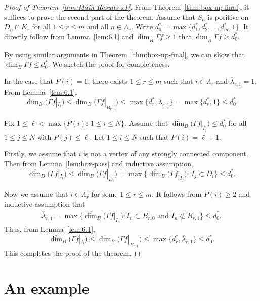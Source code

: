 \documentclass[11pt]{amsart}
\theoremstyle{definition}
\theoremstyle{remark}
\numberwithin{equation}{section}
\newcommand{\uplam}{{\overline{\lambda}}}
\def\updimB{\overline{\dim}_B}
\def\lowdimB{\underline{\dim}_B}
\begin{document}
\begin{proof}[Proof of Theorem~\ref{thm:Main-Results-x1}]
From Theorem~\ref{thm:box-up-final}, it suffices to prove the second part of the theorem. Assume that $S_n $ is positive on $D_n \cap K_r$ for all $1\leq r\leq m$ and all $n\in \Lambda_r$. Write $d_0^*=\max \{ d_1^*, d_2^*, \ldots, d_m^*,1\}.$
It directly follow from Lemma~\ref{lem:6.1} and $\lowdimB \Gamma f \geq 1$ that 
$\lowdimB \Gamma f \geq d_0^*$.

By using similar arguments in Theorem~\ref{thm:box-up-final}, we can show that $\updimB \Gamma f \leq d_0^*$. We sketch the proof for completeness.


In the case that $P(i)=1$, there exists $1\leq r\leq m$ such that $i\in \Lambda_r$ and $\uplam_{r,1}=1$. From Lemma~\ref{lem:6.1},
$$\updimB \big(\Gamma f|_{I_i}\big)\leq \updimB \big(\Gamma f|_{B_{r,1}}\big) \leq \max \{ d_r^*, \uplam_{r,1}\}=\max \{ d_r^*, 1\}\leq d_0^*. $$



Fix $1\leq \ell<\max\{P(i):\, 1\leq i\leq N\}$. Assume that $\updimB \big(\Gamma f|_{I_j}\big) \leq d_0^*$ for all $1\leq j \leq N$ with $P(j)\leq \ell$. Let $1\leq i\leq N$ such that $P(i)= \ell+1$. 

Firstly, we assume that $i$ is not a vertex of any strongly connected component. 
Then from Lemma~\ref{lem:box-pass} and inductive assumption,
\[ \updimB \big(\Gamma f|_{I_i}\big)  \leq  \updimB \big(\Gamma f|_{D_i}\big) =\max\big\{\updimB \big(\Gamma f|_{I_j}\big):\,I_{j}\subset D_{i}\big\}\leq d_0^*. \]

Now we assume that $ i \in \Lambda_r$ for some $1\leq r\leq m $. 
It follows from $P(i)\geq 2$ and inductive assumption that
\begin{align*}
	\uplam_{r,1} =\max\Big\{ \updimB \big(\Gamma f|_{I_n}\big): I_n\subset B_{r,0} \textrm{ and } I_n\not\subset B_{r,1} \Big\}\leq d_0^*. 
\end{align*}
Thus, from Lemma~\ref{lem:6.1},
$$\updimB \big(\Gamma f|_{I_i}\big)\leq \updimB \big(\Gamma f|_{B_{r,1}}\big) \leq \max \{ d_r^*, \uplam_{r,1}\}\leq d_0^*. $$ 
This completes the proof of the theorem.
\end{proof}







\section{An example}
\end{document}
